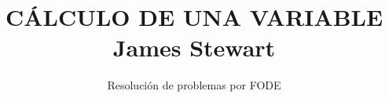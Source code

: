 \normalfont

\author{\Large Resolución de problemas por FODE}
\title{	CÁLCULO DE UNA VARIABLE \\ \small James Stewart}
\date{}
\pagestyle{empty}
\maketitle
\thispagestyle{empty}
\let\cleardoublepage\clearpage
\tableofcontents 								%


 
\let\cleardoublepage\clearpage
